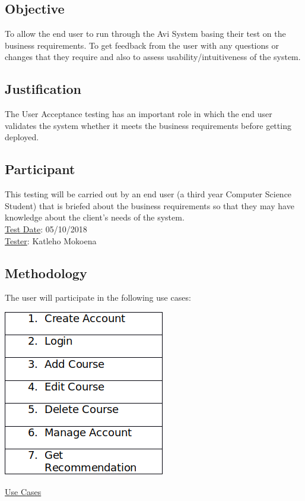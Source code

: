 \documentclass[10pt]{article}
\begin{document}
\subsection{Objective}
To allow the end user to run through the Avi System basing their test on the business requirements. To get feedback from the user with any questions or changes that they require and also to assess usability/intuitiveness of the system.

\subsection{Justification}
The User Acceptance testing has an important role in which the end user validates the system whether it meets the business requirements before getting deployed. 

\subsection{Participant}
This testing will be carried out by an end user (a third year Computer Science Student) that is briefed about the business requirements so that they may have knowledge about the client’s needs of the system. \\

\underline{Test Date}: 05/10/2018 \\

\underline{Tester}: Katleho Mokoena \\

\subsection{Methodology}

The user will participate in the following use cases: 

\begin{center}
\includegraphics[width=.6\textwidth]{methodology.png}
\end{center}
\caption{\underline{Use Cases}} \\ \\
\end{document}

